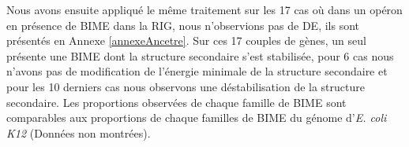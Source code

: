 \documentclass[12pt,a4paper]{report}
\begin{document}
\begin{onehalfspace}
\begin{figure}
{\label{fig:ancetre} }
\end{figure}

\begin{figure}
\end{figure}

Nous avons ensuite appliqué le même traitement sur les 17 cas où dans un opéron en présence de BIME dans la RIG, nous n'observions pas de DE, ils sont présentés en Annexe \ref{annexeAncetre}. Sur ces 17 couples de gènes, un seul présente une BIME dont la structure secondaire s'est stabilisée, pour 6 cas nous n'avons pas de modification de l'énergie minimale de la structure secondaire et pour les 10 derniers cas nous observons une déstabilisation de la structure secondaire. Les proportions observées de chaque famille de BIME sont comparables aux proportions de chaque familles de BIME du génome d'\textit{E. coli K12} (Données non montrées).


\end{onehalfspace}
\end{document}
